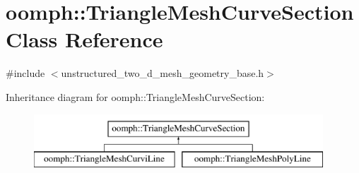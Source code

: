 \hypertarget{classoomph_1_1TriangleMeshCurveSection}{}\section{oomph\+:\+:Triangle\+Mesh\+Curve\+Section Class Reference}
\label{classoomph_1_1TriangleMeshCurveSection}


{\ttfamily \#include $<$unstructured\+\_\+two\+\_\+d\+\_\+mesh\+\_\+geometry\+\_\+base.\+h$>$}

Inheritance diagram for oomph\+:\+:Triangle\+Mesh\+Curve\+Section\+:\begin{figure}[H]
\begin{center}
\leavevmode
\includegraphics[height=2.000000cm]{classoomph_1_1TriangleMeshCurveSection}
\end{center}
\end{figure}
